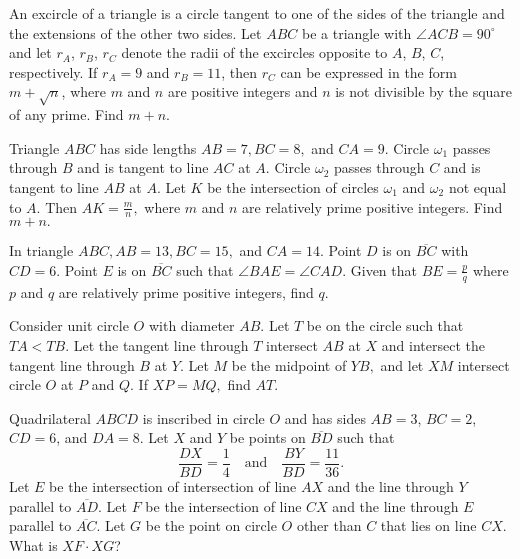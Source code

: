 \documentclass{article}
\begin{document}
\begin{req}[CIME 2020]{6}
An excircle of a triangle is a circle tangent to one of the sides of the triangle and the extensions of the other two sides. Let $ABC$ be a triangle with $\angle ACB=90^\circ$ and let $r_A$, $r_B$, $r_C$ denote the radii of the excircles opposite to $A$, $B$, $C$, respectively. If $r_A=9$ and $r_B=11$, then $r_C$ can be expressed in the form $m+\sqrt{n}$, where $m$ and $n$ are positive integers and $n$ is not divisible by the square of any prime. Find $m+n$.
\end{req}

\begin{prob}[AIME II 2019/11]{6}
Triangle $ABC$ has side lengths $AB=7, BC=8,$ and $CA=9.$ Circle $\omega_1$ passes through $B$ and is tangent to line $AC$ at $A.$ Circle $\omega_2$ passes through $C$ and is tangent to line $AB$ at $A.$ Let $K$ be the intersection of circles $\omega_1$ and $\omega_2$ not equal to $A.$ Then $AK=\tfrac mn,$ where $m$ and $n$ are relatively prime positive integers. Find $m+n.$
\end{prob}

\begin{prob}[AIME II 2005/14]{6}
In triangle $ABC, AB=13, BC=15,$ and $CA = 14.$ Point $D$ is on $\overline{BC}$ with $CD=6.$ Point $E$ is on $\overline{BC}$ such that $\angle BAE = \angle CAD.$ Given that $BE=\frac pq$ where $p$ and $q$ are relatively prime positive integers, find $q.$
\end{prob}

\begin{prob}[ART 2019/6]{6}
Consider unit circle $O$ with diameter $AB.$ Let $T$ be on the circle such that $TA<TB.$ Let the tangent line through $T$ intersect $AB$ at $X$ and intersect the tangent line through $B$ at $Y.$ Let $M$ be the midpoint of $YB,$ and let $XM$ intersect circle $O$ at $P$ and $Q.$ If $XP=MQ,$ find $AT.$
\end{prob}

\begin{prob}[AMC 12A 2017/24]{9}
Quadrilateral $ABCD$ is inscribed in circle $O$ and has sides $AB = 3$, $BC = 2$, $CD = 6$, and $DA = 8$. Let $X$ and $Y$ be points on $\overline{BD}$ such that
\[\frac{DX}{BD} = \frac{1}{4} \quad \text{and} \quad \frac{BY}{BD} = \frac{11}{36}.\]Let $E$ be the intersection of intersection of line $AX$ and the line through $Y$ parallel to $\overline{AD}$. Let $F$ be the intersection of line $CX$ and the line through $E$ parallel to $\overline{AC}$. Let $G$ be the point on circle $O$ other than $C$ that lies on line $CX$. What is $XF \cdot XG$?
\end{prob}
\end{document}
